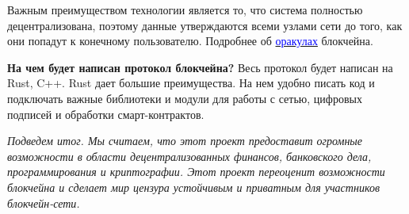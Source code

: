 \documentclass[11pt]{article}
\begin{document}
\begin{multicols}{2}
Важным преимуществом технологии является то, что система полностью децентрализована, поэтому данные утверждаются всеми узлами сети до того, как они попадут к конечному пользователю. Подробнее об \href{https://chain.link/education/blockchain-oracles}{\textcolor{blue}{оракулах}} блокчейна.

\vspace{1\baselineskip}
\textbf{На чем будет написан протокол блокчейна?} Весь протокол будет написан на Rust, C++. Rust дает большие преимущества. На нем удобно писать код и подключать важные библиотеки и модули для работы с сетью, цифровых подписей и обработки смарт-контрактов.

\vspace{1\baselineskip}
\textit{Подведем итог. Мы считаем, что этот проект предоставит огромные возможности в области децентрализованных финансов, банковского дела, программирования и криптографии. Этот проект переоценит возможности блокчейна и сделает мир цензура устойчивым и приватным для участников блокчейн-сети.}

\end{multicols}
\end{document}
